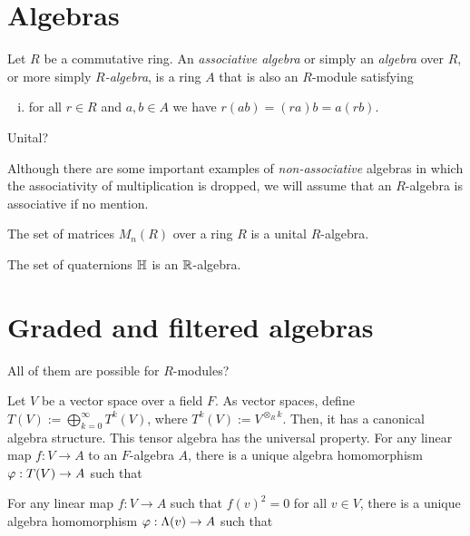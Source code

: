 \documentclass{../../large}
\begin{document}
\section{Algebras}
\begin{prb}
Let $R$ be a commutative ring.
An \emph{associative algebra} or simply an \emph{algebra} over $R$, or more simply \emph{$R$-algebra}, is a ring $A$ that is also an $R$-module satisfying
\begin{enumerate}[(i)]
\item for all $r\in R$ and $a,b\in A$ we have $r(ab)=(ra)b=a(rb)$.
\end{enumerate}
Unital?

Although there are some important examples of \emph{non-associative} algebras in which the associativity of multiplication is dropped, we will assume that an $R$-algebra is associative if no mention.
\begin{parts}
\item The set of matrices $M_n(R)$ over a ring $R$ is a unital $R$-algebra.
\item The set of quaternions $\mathbb{H}$ is an $\mathbb{R}$-algebra.
\end{parts}
\end{prb}



\section{Graded and filtered algebras}

All of them are possible for $R$-modules?

\begin{prb}
Let $V$ be a vector space over a field $F$.
As vector spaces, define $T(V):=\bigoplus_{k=0}^\infty T^k(V)$, where $T^k(V):=V^{\otimes_Rk}$.
Then, it has a canonical algebra structure.
This tensor algebra has the universal property.
For any linear map $f:V\to A$ to an $F$-algebra $A$, there is a unique algebra homomorphism $\varphi:T(V)\to A$ such that



For any linear map $f:V\to A$ such that $f(v)^2=0$ for all $v\in V$, there is a unique algebra homomorphism $\varphi:\Lambda(v)\to A$ such that
\end{prb}
\end{document}
